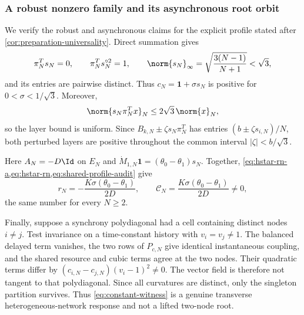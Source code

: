 \subsubsection{A robust nonzero family and its asynchronous root orbit}

We verify the robust and asynchronous claims for the explicit profile stated
after \cref{cor:preparation-universality}.  Direct summation gives
\begin{equation}
 \pi_N^Ts_N=0,\qquad \pi_N^Ts_N^{\circ2}=1,\qquad
 \norm{s_N}_\infty
 =\sqrt{\frac{3(N-1)}{N+1}}<\sqrt3,                  \label{eq:shared-profile-audit}
\end{equation}
and its entries are pairwise distinct.  Thus
\(c_N=\mathbf1+\sigma s_N\) is positive for
\(0<\sigma<1/\sqrt3\).  Moreover,
\[
 \norm{s_N\pi_N^Tx}_N
 \le2\sqrt3\,\norm{x}_N,
\]
so the layer bound is uniform.  Since
\(B_{k,N}\pm\zeta s_N\pi_N^T\) has entries
\((b\pm\zeta s_{i,N})/N\), both perturbed layers are positive throughout
the common interval \(|\zeta|<b/\sqrt3\).

Here \(A_N=-D\Id\) on \(E_N\) and
\(\dot M_{1,N}\mathbf1=(\theta_0-\theta_1)s_N\).
Together, \cref{eq:hstar-rn-a,eq:hstar-rn,eq:shared-profile-audit} give
\begin{equation}
 r_N=-\frac{K\sigma(\theta_0-\theta_1)}{2D},
 \qquad
 \mathscr C_N=\frac{K\sigma(\theta_0-\theta_1)}{2D}\ne0,
                                                               \label{eq:constant-witness}
\end{equation}
the same number for every \(N\ge2\).

Finally, suppose a synchrony polydiagonal had a cell containing distinct
nodes \(i\ne j\).  Test invariance on a time-constant history with
\(v_i=v_j\ne1\).  The balanced delayed term vanishes, the two rows of
\(P_{c,N}\) give identical instantaneous coupling, and the shared resource
and cubic terms agree at the two nodes.  Their quadratic terms differ by
\((c_{i,N}-c_{j,N})(v_i-1)^2\ne0\).  The vector field is therefore not
tangent to that polydiagonal.  Since all curvatures are distinct, only the
singleton partition survives.  Thus \cref{eq:constant-witness} is a genuine
transverse heterogeneous-network response and not a lifted two-node root.

